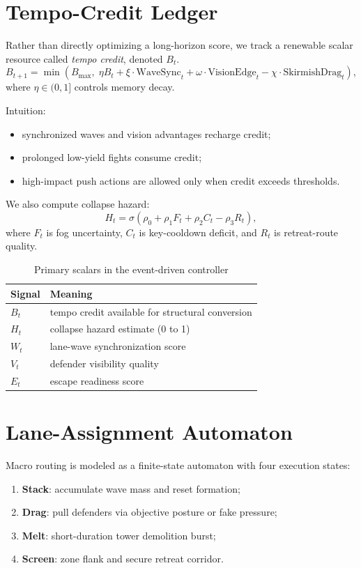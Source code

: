 \documentclass[runningheads]{llncs}
\begin{document}
\section{Tempo-Credit Ledger}
Rather than directly optimizing a long-horizon score, we track a renewable scalar resource called \emph{tempo credit}, denoted $B_t$.
\[
B_{t+1}=\min\!\left(B_{\max},\;
\eta B_t
+\xi\cdot \mathrm{WaveSync}_t
+\omega\cdot \mathrm{VisionEdge}_t
-\chi\cdot \mathrm{SkirmishDrag}_t\right),
\]
where $\eta\in(0,1]$ controls memory decay.

Intuition:
\begin{itemize}
\item synchronized waves and vision advantages recharge credit;
\item prolonged low-yield fights consume credit;
\item high-impact push actions are allowed only when credit exceeds thresholds.
\end{itemize}

We also compute collapse hazard:
\[
H_t=\sigma(\rho_0+\rho_1F_t+\rho_2C_t-\rho_3R_t),
\]
where $F_t$ is fog uncertainty, $C_t$ is key-cooldown deficit, and $R_t$ is retreat-route quality.

\begin{table}[t]
\centering
\caption{Primary scalars in the event-driven controller}
\begin{tabular}{ll}
\toprule
Signal & Meaning \\
\midrule
$B_t$ & tempo credit available for structural conversion \\
$H_t$ & collapse hazard estimate (0 to 1) \\
$W_t$ & lane-wave synchronization score \\
$V_t$ & defender visibility quality \\
$E_t$ & escape readiness score \\
\bottomrule
\end{tabular}
\end{table}

\section{Lane-Assignment Automaton}
Macro routing is modeled as a finite-state automaton with four execution states:
\begin{enumerate}
\item \textbf{Stack}: accumulate wave mass and reset formation;
\item \textbf{Drag}: pull defenders via objective posture or fake pressure;
\item \textbf{Melt}: short-duration tower demolition burst;
\item \textbf{Screen}: zone flank and secure retreat corridor.
\end{enumerate}
\end{document}
